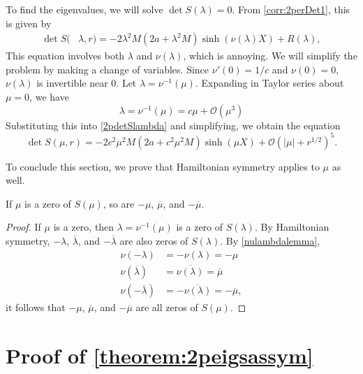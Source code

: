\documentclass[thesis.tex]{subfiles}
\begin{document}
To find the eigenvalues, we will solve $\det S(\lambda ) = 0$. From \cref{corr:2perDet1}, this is given by
\begin{equation}\label{2pdetSlambda}
\begin{aligned}
\det S(&\lambda,r) = -2 \lambda^2 M (2a + \lambda^2 M) \sinh(\nu(\lambda)X) + R(\lambda),
\end{aligned}
\end{equation}
This equation involves both $\lambda$ and $\nu(\lambda)$, which is annoying. We will simplify the problem by making a change of variables. Since $\nu'(0) = 1/c$ and $\nu(0) = 0$, $\nu(\lambda)$ is invertible near 0. Let $\lambda = \nu^{-1}(\mu)$. Expanding in Taylor series about $\mu = 0$, we have
\begin{equation}\label{2plambdamu}
\lambda = \nu^{-1}(\mu) = c \mu + \mathcal{O}(\mu^3)
\end{equation}
Substituting this into \cref{2pdetSlambda} and simplifying, we obtain the equation
\begin{equation}\label{2detBeqmu}
\det S(\mu, r) = -2 c^2 \mu^2 M \left( 2a + c^2 \mu^2 M\right)\sinh(\mu X) + \mathcal{O}(|\mu| + r^{1/2})^5.
\end{equation}

To conclude this section, we prove that Hamiltonian symmetry applies to $\mu$ as well.

\begin{lemma}\label{lemma:Hamsymmmu}
If $\mu$ is a zero of $S(\mu)$, so are $-\mu$, $\overline{\mu}$, and $-\overline{\mu}$.
\begin{proof}
If $\mu$ is a zero, then $\lambda = \nu^{-1}(\mu)$ is a zero of $S(\lambda)$. By Hamiltonian symmetry, $-\lambda$, $\overline{\lambda}$, and $-\overline{\lambda}$ are also zeros of $S(\lambda)$. By \cref{nulambdalemma},
\begin{align*}
\nu(-\lambda) &= -\nu(\lambda) = -\mu \\
\nu(\overline{\lambda}) &= \overline{ \nu(\lambda) } = \overline{\mu} \\
\nu(-\overline{\lambda}) &= -\overline{ \nu(\lambda) } = -\overline{\mu},
\end{align*}
it follows that $-\mu$, $\overline{\mu}$, and $-\overline{\mu}$ are all zeros of $S(\mu)$.
\end{proof}
\end{lemma}

\section{Proof of \cref{theorem:2peigsassym}}
\end{document}
